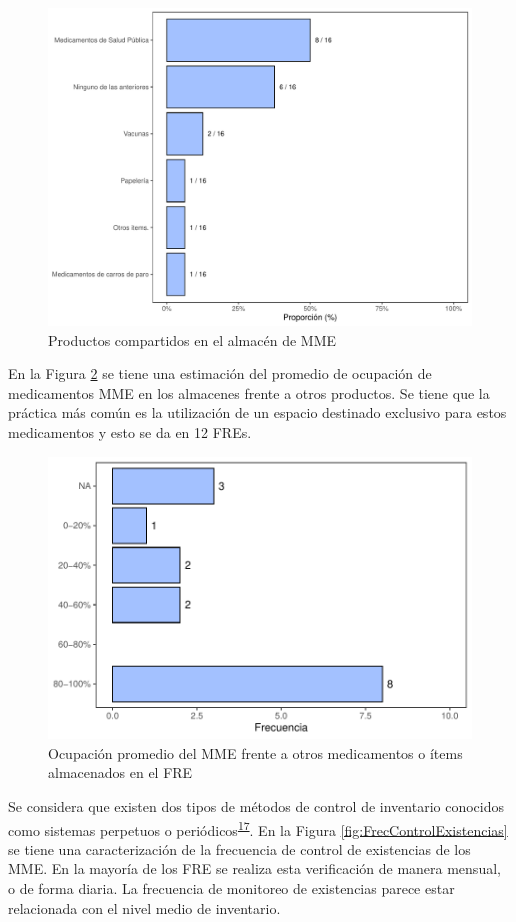 \documentclass[
]{book}
\begin{document}
\begin{figure}
\includegraphics[width=0.85\linewidth]{InformeFinal_files/figure-latex/ProductosCompartidos1-1} \caption{Productos compartidos en el almacén de MME}\label{fig:ProductosCompartidos1}
\end{figure}

En la Figura \ref{fig:PropOcupacionAlmacen} se tiene una estimación del promedio de ocupación de medicamentos MME en los almacenes frente a otros productos. Se tiene que la práctica más común es la utilización de un espacio destinado exclusivo para estos medicamentos y esto se da en 12 FREs.

\begin{figure}
\includegraphics[width=0.85\linewidth]{InformeFinal_files/figure-latex/PropOcupacionAlmacen-1} \caption{Ocupación promedio del MME frente a otros medicamentos o ítems almacenados en el FRE}\label{fig:PropOcupacionAlmacen}
\end{figure}

Se considera que existen dos tipos de métodos de control de inventario conocidos como sistemas perpetuos o periódicos\textsuperscript{\protect\hyperlink{ref-Silver2017}{17}}.
En la Figura \ref{fig:FrecControlExistencias} se tiene una caracterización de la frecuencia de control de existencias de los MME. En la mayoría de los FRE se realiza esta verificación de manera mensual, o de forma diaria. La frecuencia de monitoreo de existencias parece estar relacionada con el nivel medio de inventario.
\end{document}
